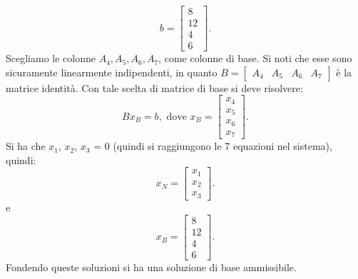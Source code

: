 \[
b = \begin{bmatrix}
8 \\
12 \\
4 \\
6
\end{bmatrix}.
\]
Scegliamo le colonne $A_4, A_5, A_6, A_7$, come colonne di base. Si noti che esse sono sicuramente linearmente indipendenti, in quanto $B = \begin{bmatrix} A_4 & A_5 & A_6 & A_7 \end{bmatrix}$ è la matrice identità.
Con tale scelta di matrice di base si deve risolvere:
\[
B x_B = b , \text{ dove }  x_B = \begin{bmatrix}
x_4 \\
x_5 \\
x_6 \\
x_7
\end{bmatrix}.
\]
Si ha che $x_1$, $x_2$, $x_3$ = 0 (quindi si raggiungono le 7 equazioni nel sistema), quindi:
\[
x_N = \begin{bmatrix}
x_1 \\
x_2 \\
x_3
\end{bmatrix}.
\]
e 
\[
x_B = \begin{bmatrix}
8 \\
12 \\
4 \\
6
\end{bmatrix}.
\]
Fondendo queste soluzioni si ha una soluzione di base ammissibile.

